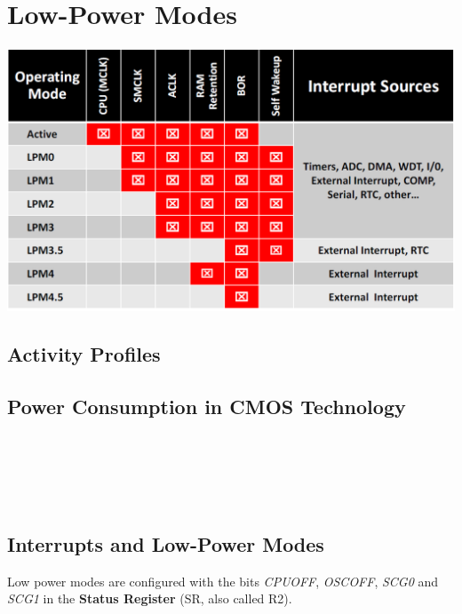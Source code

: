 \section{Low-Power Modes }
\includegraphics[width=.8\columnwidth, center]{Images/LPO_interrupts.png}

\subsection{Activity Profiles}

\subsection{Power Consumption in CMOS Technology}
\begin{minipage}{0.5\columnwidth}
	\vspace{0pt}
	
\end{minipage}
\begin{minipage}{0.5\columnwidth}
	\vspace{0pt}
	\\
	\\
	\\
	\\
\end{minipage}
\vspace{2mm}


\subsection{Interrupts and Low-Power Modes}
Low power modes are configured with the bits \textit{CPUOFF}, \textit{OSCOFF}, \textit{SCG0} and \textit{SCG1} in the \textbf{Status Register} (SR, also called R2).

